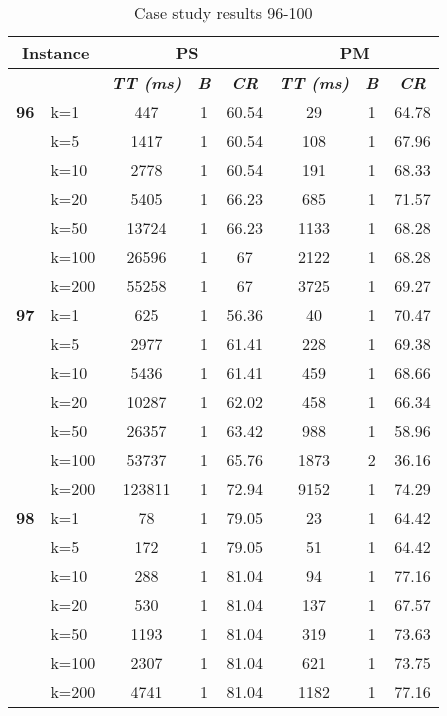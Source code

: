     \begin{table}[htbp]
    \caption{Case study results 96-100}
    \centering
    \begin{tabular}{|l|l|c|c|c|c|c|c|}
    \hline
    \multicolumn{ 2}{|c|}{\textbf{Instance}} & \multicolumn{ 3}{c|}{\textbf{PS}} & \multicolumn{ 3}{c|}{\textbf{PM}} \\ \hline
    \multicolumn{ 2}{|l|}{} & \textbf{\textit{TT (ms)}} & \textbf{\textit{B}} & \textbf{\textit{CR}} & \textbf{\textit{TT (ms)}} & \textbf{\textit{B}} & \textbf{\textit{CR}} \\ \hline
    \multicolumn{1}{|r|}{\textbf{96}} & k=1 & 447 & 1 & 60.54 & 29 & 1 & 64.78 \\ 
     & k=5 & 1417 & 1 & 60.54 & 108 & 1 & 67.96 \\ 
     & k=10 & 2778 & 1 & 60.54 & 191 & 1 & 68.33 \\ 
     & k=20 & 5405 & 1 & 66.23 & 685 & 1 & 71.57 \\ 
     & k=50 & 13724 & 1 & 66.23 & 1133 & 1 & 68.28 \\ 
     & k=100 & 26596 & 1 & 67 & 2122 & 1 & 68.28 \\ 
     & k=200 & 55258 & 1 & 67 & 3725 & 1 & 69.27 \\ \hline
    \multicolumn{1}{|r|}{\textbf{97}} & k=1 & 625 & 1 & 56.36 & 40 & 1 & 70.47 \\ 
     & k=5 & 2977 & 1 & 61.41 & 228 & 1 & 69.38 \\ 
     & k=10 & 5436 & 1 & 61.41 & 459 & 1 & 68.66 \\ 
     & k=20 & 10287 & 1 & 62.02 & 458 & 1 & 66.34 \\ 
     & k=50 & 26357 & 1 & 63.42 & 988 & 1 & 58.96 \\ 
     & k=100 & 53737 & 1 & 65.76 & 1873 & 2 & 36.16 \\ 
     & k=200 & 123811 & 1 & 72.94 & 9152 & 1 & 74.29 \\ \hline
    \multicolumn{1}{|r|}{\textbf{98}} & k=1 & 78 & 1 & 79.05 & 23 & 1 & 64.42 \\ 
     & k=5 & 172 & 1 & 79.05 & 51 & 1 & 64.42 \\ 
     & k=10 & 288 & 1 & 81.04 & 94 & 1 & 77.16 \\ 
     & k=20 & 530 & 1 & 81.04 & 137 & 1 & 67.57 \\ 
     & k=50 & 1193 & 1 & 81.04 & 319 & 1 & 73.63 \\ 
     & k=100 & 2307 & 1 & 81.04 & 621 & 1 & 73.75 \\ 
     & k=200 & 4741 & 1 & 81.04 & 1182 & 1 & 77.16 \\ \hline

\end{tabular}
\end{table}

